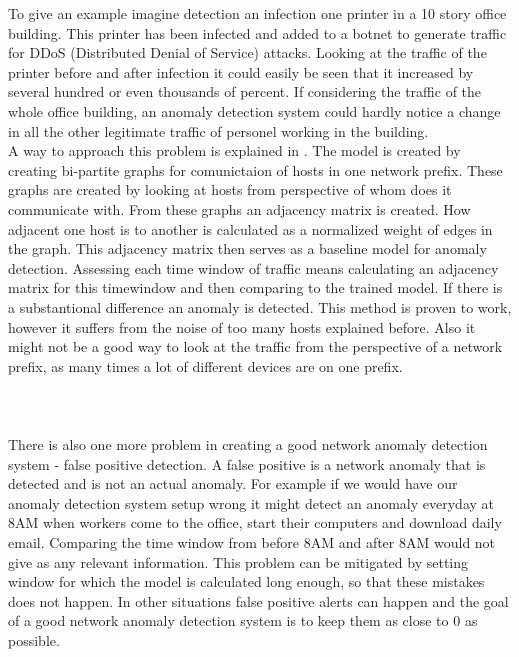 \documentclass[thesis=B,english]{FITthesis}[2012/10/20]
\begin{document}
To give an example imagine detection an infection one printer in a 10 story office building.
This printer has been infected and added to a botnet to generate traffic for DDoS (Distributed Denial of Service) attacks.
Looking at the traffic of the printer before and after infection it could easily be seen that it increased by several hundred or even thousands of percent.
If considering the traffic of the whole office building, an anomaly detection system could hardly notice a change in all the other legitimate traffic of personel working in the building. \\

A way to approach this problem is explained in \cite{xu2011network}.
The model is created by creating bi-partite graphs for comunictaion of hosts in one network prefix.
These graphs are created by looking at hosts from perspective of whom does it communicate with.
From these graphs an adjacency matrix is created.
How adjacent one host is to another is calculated as a normalized weight of edges in the graph.
This adjacency matrix then serves as a baseline model for anomaly detection.
Assessing each time window of traffic means calculating an adjacency matrix for this timewindow and then comparing to the trained model.
If there is a substantional difference an anomaly is detected.
This method is proven to work, however it suffers from the noise of too many hosts explained before.
Also it might not be a good way to look at the traffic from the perspective of a network prefix, as many times a lot of different devices are on one prefix.
\\ \\
\\ \\
There is also one more problem in creating a good network anomaly detection system - false positive detection.
A false positive is a network anomaly that is detected and is not an actual anomaly.
For example if we would have our anomaly detection system setup wrong it might detect an anomaly everyday at 8AM when workers come to the office, start their computers and download daily email.
Comparing the time window from before 8AM and after 8AM would not give as any relevant information.
This problem can be mitigated by setting window for which the model is calculated long enough, so that these mistakes does not happen.
In other situations false positive alerts can happen and the goal of a good network anomaly detection system is to keep them as close to 0 as possible.
\end{document}
